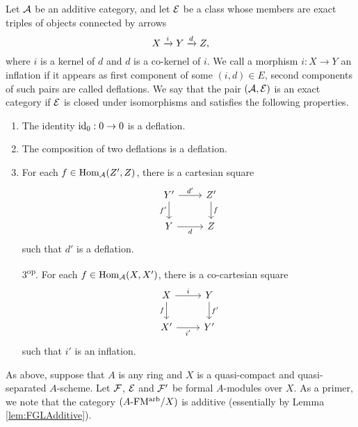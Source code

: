 \documentclass[../main.tex]{subfiles}
\begin{document}
\begin{defi}
  Let $\mathcal{A}$ be an additive category, and let $\mathcal{E}$ be a class whose
  members are exact triples of objects connected by arrows 
  \begin{equation*}
    X \xrightarrow{i} Y \xrightarrow{d} Z,
  \end{equation*}
  where $i$ is a kernel of $d$ and $d$ is a co-kernel of $i$. 
  We call a morphism $i:X \to Y$ an inflation if it appears as first component
  of some $(i,d) \in E$, second components of such pairs are called deflations.
  We say that the pair $(\mathcal{A}, \mathcal{E})$ is an exact category if 
  $\mathcal{E}$ is closed under isomorphisms and satisfies the following properties.
  \begin{enumerate}
    \item The identity $\operatorname{id}_0: 0 \to 0$ is a deflation.
    \item The composition of two deflations is a deflation.
    \item For each $f \in \operatorname{Hom}_{\mathcal{A}}(Z', Z)$, there is a cartesian square
    \begin{equation*}
        \begin{tikzcd}[ampersand replacement=\&]
        	{Y'} \& {Z'} \\
        	Y \& Z
        	\arrow["{d'}", from=1-1, to=1-2]
        	\arrow["{f'}"', from=1-1, to=2-1]
        	\arrow["f", from=1-2, to=2-2]
        	\arrow["d"', from=2-1, to=2-2]
        \end{tikzcd}
    \end{equation*}
    such that $d'$ is a deflation.
  \item[3\textsuperscript{op}.] For each $f \in \operatorname{Hom}_{\mathcal{A}}(X, X')$, there is a
    co-cartesian square
      \begin{equation*}
        \begin{tikzcd}[ampersand replacement=\&]
        	X \& Y \\
        	{X'} \& {Y'}
        	\arrow["i", from=1-1, to=1-2]
        	\arrow["f"', from=1-1, to=2-1]
        	\arrow["{f'}", from=1-2, to=2-2]
        	\arrow["{i'}"', from=2-1, to=2-2]
        \end{tikzcd}
      \end{equation*}
      such that $i'$ is an inflation.
  \end{enumerate}
\end{defi}

As above, suppose that $A$ is any ring and $X$ is a quasi-compact and
quasi-separated $A$-scheme. Let $\mathcal{F}$, $\mathcal{E}$ and $\mathcal{F}'$ be formal $A$-modules
over $X$. As a primer, we note that the category ${({A}\text-\allowbreak\mathrm{FM^{arb}}/{X})}$ is additive 
(essentially by Lemma \ref{lem:FGLAdditive}).
\end{document}
